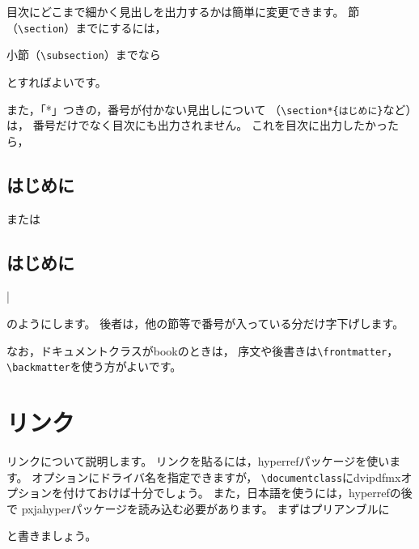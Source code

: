 目次にどこまで細かく見出しを出力するかは簡単に変更できます。
節（\verb|\section|）までにするには，
\begin{ITeX}
\setcounter{tocdepth}{1}
\end{ITeX}
小節（\verb|\subsection|）までなら
\begin{ITeX}
\setcounter{tocdepth}{2}
\end{ITeX}
とすればよいです。

また，「*」つきの，番号が付かない見出しについて
（\verb|\section*{はじめに}|など）は，
番号だけでなく目次にも出力されません。
これを目次に出力したかったら，
\begin{ITeX}
\section*{はじめに}
\end{ITeX}
または
\begin{ITeX}
\section*{はじめに}|
\end{ITeX}
のようにします。
後者は，他の節等で番号が入っている分だけ字下げします。

なお，ドキュメントクラスがbookのときは，
序文や後書きは\verb|\frontmatter|，\verb|\backmatter|を使う方がよいです。



\section{リンク}
リンクについて説明します。
リンクを貼るには，hyperrefパッケージを使います。
オプションにドライバ名を指定できますが，
\verb|\documentclass|にdvipdfmxオプションを付けておけば十分でしょう。
また，日本語を使うには，hyperrefの後で
pxjahyperパッケージを読み込む必要があります。
まずはプリアンブルに
\begin{ITeX}
\usepackage{hyperref}
\usepackage{pxjahyper}
\end{ITeX}
と書きましょう。


